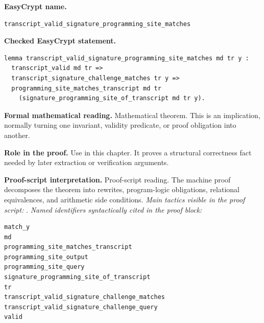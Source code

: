 \begin{formaltheorem}
\noindent\textbf{EasyCrypt name.}
\begin{lstlisting}[language=EasyCrypt,basicstyle=\ttfamily\scriptsize]
transcript_valid_signature_programming_site_matches
\end{lstlisting}
\noindent\textbf{Checked EasyCrypt statement.}
\begin{lstlisting}[language=EasyCrypt,basicstyle=\ttfamily\scriptsize]
lemma transcript_valid_signature_programming_site_matches md tr y :
  transcript_valid md tr =>
  transcript_signature_challenge_matches tr y =>
  programming_site_matches_transcript md tr
    (signature_programming_site_of_transcript md tr y).
\end{lstlisting}
\noindent\textbf{Formal mathematical reading.}
Mathematical theorem. This is an implication, normally turning one invariant, validity predicate, or proof obligation into another.

\noindent\textbf{Role in the proof.}
Use in this chapter. It proves a structural correctness fact needed by later extraction or verification arguments.

\noindent\textbf{Proof-script interpretation.}
Proof-script reading. The machine proof decomposes the theorem into rewrites, program-logic obligations, relational equivalences, and arithmetic side conditions.
\emph{Main tactics visible in the proof script:} .
\emph{Named identifiers syntactically cited in the proof block:}
\begin{lstlisting}[language=EasyCrypt,basicstyle=\ttfamily\scriptsize]
match_y
md
programming_site_matches_transcript
programming_site_output
programming_site_query
signature_programming_site_of_transcript
tr
transcript_valid_signature_challenge_matches
transcript_valid_signature_challenge_query
valid
\end{lstlisting}

\end{formaltheorem}

